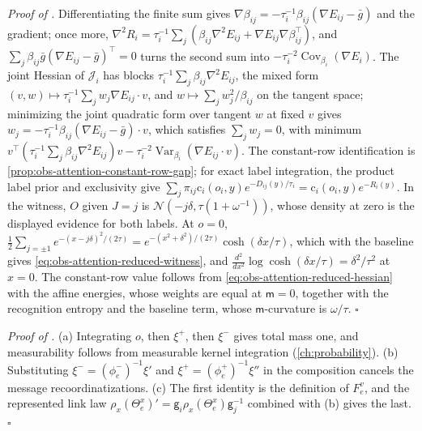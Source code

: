 \noindent\emph{Proof of .}
Differentiating the finite sum gives
\(\nabla\beta_{ij}=-\tau_i^{-1}\beta_{ij}(\nabla E_{ij}-\bar g)\) and the
gradient; once more,
\(\nabla^2R_i=\tau_i^{-1}\sum_j(\beta_{ij}\nabla^2E_{ij}+\nabla E_{ij}\nabla\beta_{ij}^\top)\),
and \(\sum_j\beta_{ij}\bar g(\nabla E_{ij}-\bar g)^\top=0\) turns the second
sum into \(-\tau_i^{-2}\operatorname{Cov}_{\beta_i}(\nabla E_i)\). The joint
Hessian of \(\mathscr J_i\) has blocks
\(\tau_i^{-1}\sum_j\beta_{ij}\nabla^2E_{ij}\), the mixed form
\((v,w)\mapsto\tau_i^{-1}\sum_jw_j\nabla E_{ij}\cdot v\), and
\(w\mapsto\sum_jw_j^2/\beta_{ij}\) on the tangent space; minimizing the joint
quadratic form over tangent \(w\) at fixed \(v\) gives
\(w_j=-\tau_i^{-1}\beta_{ij}(\nabla E_{ij}-\bar g)\cdot v\), which satisfies
\(\sum_jw_j=0\), with minimum
\(v^\top(\tau_i^{-1}\sum_j\beta_{ij}\nabla^2E_{ij})v
-\tau_i^{-2}\operatorname{Var}_{\beta_i}(\nabla E_{ij}\cdot v)\). The
constant-row identification is \cref{prop:obs-attention-constant-row-gap}; for
exact label integration, the product label prior and exclusivity give
\(\sum_j\pi_{ij}\mathrm c_i(o_i,y)e^{-D_{ij}(y)/\tau_i}
=\mathrm c_i(o_i,y)e^{-R_i(y)}\). In the witness, \(O\) given \(J=j\) is
\(\mathcal N(-j\delta,\tau(1+\omega^{-1}))\), whose density at zero is the
displayed evidence for both labels. At \(o=0\),
\(\frac12\sum_{j=\pm1}e^{-(x-j\delta)^2/(2\tau)}=e^{-(x^2+\delta^2)/(2\tau)}
\cosh(\delta x/\tau)\), which with the baseline gives
\eqref{eq:obs-attention-reduced-witness}, and
\(\frac{d^2}{dx^2}\log\cosh(\delta x/\tau)=\delta^2/\tau^2\) at \(x=0\). The
constant-row value follows from \eqref{eq:obs-attention-reduced-hessian} with
the affine energies, whose weights are equal at \(\mathsf m=0\), together with
the recognition entropy and the baseline term, whose \(\mathsf m\)-curvature is
\(\omega/\tau\). \(\square\)

\noindent\emph{Proof of .}
(a) Integrating \(o\), then \(\xi^+\), then \(\xi^-\) gives total mass one, and
measurability follows from measurable kernel integration
(\cref{ch:probability}). (b) Substituting \(\xi^-=(\phi_e^-)^{-1}\xi'\) and
\(\xi^+=(\phi_e^+)^{-1}\xi''\) in the composition cancels the message
recoordinatizations. (c) The first identity is the definition of \(F_e^v\), and
the represented link law \(\rho_x(\Theta^x_e)'=\mathsf g_i\rho_x(\Theta^x_e)
\mathsf g_j^{-1}\) combined with (b) gives the last. \(\square\)

